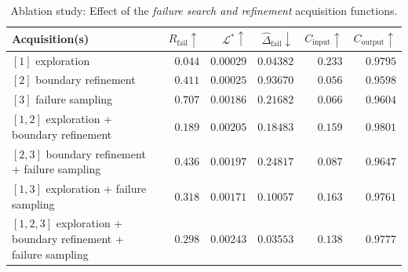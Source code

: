 \begin{table}[!b]
\begin{center}
\begin{threeparttable}
    \begin{adjustbox}{max width=\textwidth}
    \begin{small}
    \begin{tabular}{@{}lrrrrr@{}}
    \toprule
        Acquisition(s) & $R_\text{fail} \uparrow$ & $\mathcal{L}^* \uparrow$ & $\hat{\Delta}_\text{fail} \downarrow$ & $C_\text{input} \uparrow$ & $C_\text{output} \uparrow$\\
        \midrule
        $[1]$ exploration                                               &  $\num{0.044}$               &  $\num{0.00029}$             &  $\num{0.04382}$              &  \bfseries$\num{0.233}$       &  $\num{0.9795}$  \\
        $[2]$ boundary refinement                                       &  $\num{0.411}$               &  $\num{0.00025}$             &  $\num{0.93670}$              &  $\num{0.056}$                &  $\num{0.9598}$  \\
        $[3]$ failure sampling                                          &  \bfseries$\num{0.707}$      &  $\num{0.00186}$             &  $\num{0.21682}$              &  $\num{0.066}$                &  $\num{0.9604}$  \\
        $[1,2]$ exploration + boundary refinement                       &  $\num{0.189}$               &  $\num{0.00205}$             &  $\num{0.18483}$              &  $\num{0.159}$                &  \bfseries$\num{0.9801}$  \\
        $[2,3]$ boundary refinement + failure sampling                  &  $\num{0.436}$               &  $\num{0.00197}$             &  $\num{0.24817}$              &  $\num{0.087}$                &  $\num{0.9647}$  \\
        $[1,3]$ exploration + failure sampling                          &  $\num{0.318}$               &  $\num{0.00171}$             &  $\num{0.10057}$              &  $\num{0.163}$                &  $\num{0.9761}$  \\
        $[1,2,3]$ exploration + boundary refinement + failure sampling  &  $\num{0.298}$               &  \bfseries$\num{0.00243}$    &  \bfseries$\num{0.03553}$     &  $\num{0.138}$                &  $\num{0.9777}$  \\
        \bottomrule
    \end{tabular}
    \end{small}
    \end{adjustbox}
\end{threeparttable}
\end{center}
\caption{Ablation study: Effect of the \textit{failure search and refinement} acquisition functions.}
\label{tab:ablation}
\end{table}


